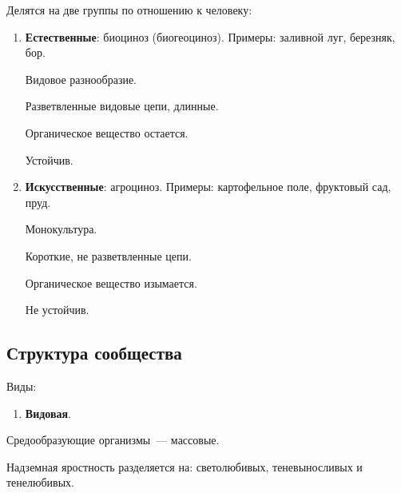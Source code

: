 \documentclass[12pt]{article}
\begin{document}
	Делятся на две группы по отношению к человеку:
	
	\begin{enumerate}
		\item \textbf{Естественные}: биоциноз (биогеоциноз). Примеры: заливной луг, березняк, бор.
		
		Видовое разнообразие.
		
		Разветвленные видовые цепи, длинные.
		
		Органическое вещество остается.
		
		Устойчив.
		
		\item \textbf{Искусственные}: агроциноз. Примеры: картофельное поле, фруктовый сад, пруд.
		
		Монокультура.
		
		Короткие, не разветвленные цепи.
		
		Органическое вещество изымается.
		
		Не устойчив.
	\end{enumerate}
	
	\subsection{Структура сообщества}
	
	Виды:
	
	\begin{enumerate}
		\item \textbf{Видовая}.
	\end{enumerate}
	
	Средообразующие организмы~--- массовые.
	
	Надземная яростность разделяется на: светолюбивых, теневыносливых и тенелюбивых.
\end{document}

